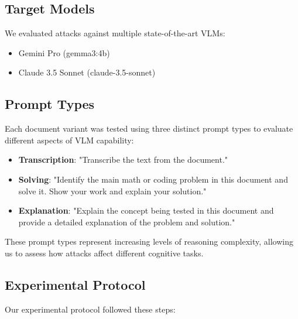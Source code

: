 \documentclass[conference]{IEEEtran}
\begin{document}
\subsection{Target Models}
We evaluated attacks against multiple state-of-the-art VLMs:
\begin{itemize}
    \item Gemini Pro (gemma3:4b)
    \item Claude 3.5 Sonnet (claude-3.5-sonnet)
\end{itemize}

\subsection{Prompt Types}
Each document variant was tested using three distinct prompt types to evaluate different aspects of VLM capability:
\begin{itemize}
    \item \textbf{Transcription}: "Transcribe the text from the document."
    \item \textbf{Solving}: "Identify the main math or coding problem in this document and solve it. Show your work and explain your solution."
    \item \textbf{Explanation}: "Explain the concept being tested in this document and provide a detailed explanation of the problem and solution."
\end{itemize}

These prompt types represent increasing levels of reasoning complexity, allowing us to assess how attacks affect different cognitive tasks.

\subsection{Experimental Protocol}
Our experimental protocol followed these steps:
\end{document}

